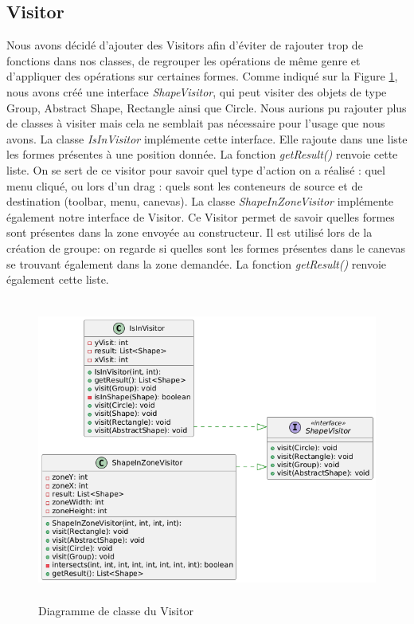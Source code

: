 \documentclass{article}
\begin{document}
\subsection{Visitor}
Nous avons décidé d'ajouter des Visitors afin d'éviter de rajouter trop de fonctions dans nos classes,
de regrouper les opérations de même genre et d'appliquer des opérations sur certaines formes.
Comme indiqué sur la Figure \ref{Visitor}, nous avons créé une interface \textit{ShapeVisitor}, qui
peut visiter des objets de type Group, Abstract Shape, Rectangle ainsi que Circle. Nous aurions pu rajouter plus de classes à
visiter mais cela ne semblait pas nécessaire pour l'usage que nous avons.
La classe \textit{IsInVisitor} implémente cette interface. Elle rajoute dans une liste les formes présentes à une position donnée.
La fonction \textit{getResult()} renvoie cette liste.
On se sert de ce visitor pour savoir quel type d'action on a réalisé : quel menu cliqué, ou lors d'un drag : quels sont les
conteneurs de source et de destination (toolbar, menu, canevas).
La classe \textit{ShapeInZoneVisitor} implémente également notre interface de Visitor.
Ce Visitor permet de savoir quelles formes sont présentes dans la zone envoyée au constructeur. Il est utilisé lors de la création de groupe:
on regarde si quelles sont les formes présentes dans le canevas se trouvant également dans la zone demandée.
La fonction \textit{getResult()} renvoie également cette liste.
\begin{figure}[h]
    \centering
    \includegraphics[width=\textwidth,height=10.0cm,keepaspectratio]{visitor.png}
    \caption{Diagramme de classe du Visitor}
    \label{Visitor}
\end{figure}
\FloatBarrier
\end{document}
